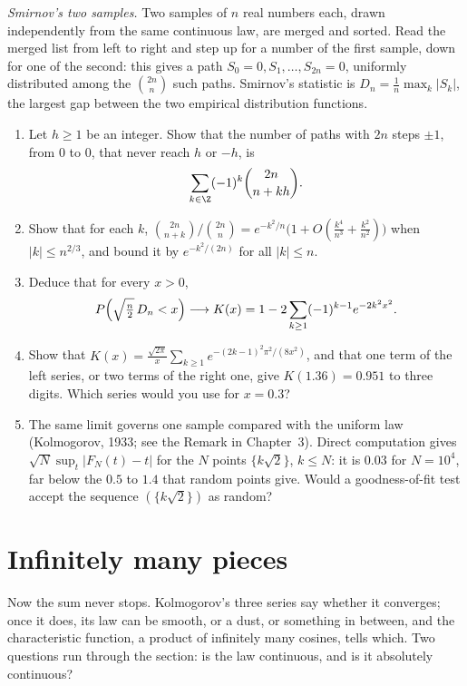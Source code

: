 \begin{exercise}[Journey]\label{pb:smirnov}
\emph{Smirnov's two samples.} Two samples of $n$ real numbers each, drawn independently from the same continuous law, are merged and sorted. Read the merged
list from left to right and step up for a number of the first sample, down for one of the second: this gives a path $S_0=0,S_1,\dots,S_{2n}=0$, uniformly
distributed among the $\binom{2n}n$ such paths. Smirnov's statistic is $D_n=\frac1n\max_k|S_k|$, the largest gap between the two empirical distribution functions.
\begin{enumerate}[label=(\alph*)]
\item Let $h\ge1$ be an integer. Show that the number of paths with $2n$ steps $\pm1$, from $0$ to $0$, that never reach $h$ or $-h$, is
\[
\sum_{k\in\Z}(-1)^k\binom{2n}{n+kh}.
\]
\item Show that for each $k$, $\binom{2n}{n+k}\big/\binom{2n}n=e^{-k^2/n}\bigl(1+O(\frac{k^4}{n^3}+\frac{k^2}{n^2})\bigr)$ when $|k|\le n^{2/3}$, and bound it by $e^{-k^2/(2n)}$ for all $|k|\le n$.
\item Deduce that for every $x>0$,
\[
P\Bigl(\sqrt{\tfrac n2}\,D_n<x\Bigr)\longrightarrow K(x)=1-2\sum_{k\ge1}(-1)^{k-1}e^{-2k^2x^2}.
\]
\item Show that $K(x)=\frac{\sqrt{2\pi}}x\sum_{k\ge1}e^{-(2k-1)^2\pi^2/(8x^2)}$, and that one term of the left series, or two terms of the right one, give $K(1.36)=0.951$ to three digits. Which series would you use for $x=0.3$?
\item The same limit governs one sample compared with the uniform law (Kolmogorov, 1933; see the Remark in Chapter~3). Direct computation gives
$\sqrt N\sup_t|F_N(t)-t|$ for the $N$ points $\{k\sqrt2\}$, $k\le N$: it is $0.03$ for $N=10^4$, far below the $0.5$ to $1.4$ that random points give. Would a goodness-of-fit
test accept the sequence $(\{k\sqrt2\})$ as random?
\end{enumerate}
\end{exercise}

\section{Infinitely many pieces}

Now the sum never stops. Kolmogorov's three series say whether it converges; once it does, its law can be smooth, or a dust, or something in between,
and the characteristic function, a product of infinitely many cosines, tells which. Two questions run through the section: is the law continuous, and is it
absolutely continuous?


